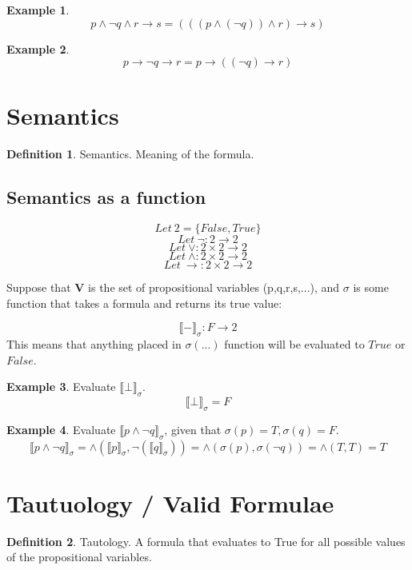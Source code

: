 \documentclass{article}
\theoremstyle{definition}
\newtheorem{df}{Definition}[section]
\newtheorem{ex}{Example}[section]
\begin{document}
  \begin{ex}
    \[p \wedge \neg q \wedge r \rightarrow s = (((p\wedge (\neg q)) \wedge r) \rightarrow s) \]
  \end{ex}
  \begin{ex}
    \[p \rightarrow \neg q \rightarrow r = p \rightarrow ((\neg q) \rightarrow r) \]
  \end{ex}

  \section{Semantics}
  \begin{df}{Semantics.}
    Meaning of the formula.
  \end{df}
  
  \subsection{Semantics as a function}
  \[Let\ 2 = \{False, True\}\]
  \[Let\ \neg: 2 \rightarrow 2\]
  \[Let\ \lor: 2 \times 2 \rightarrow 2 \]
  \[Let\ \wedge: 2 \times 2 \rightarrow 2 \]
  \[Let\ \rightarrow: 2 \times 2 \rightarrow 2 \]
  
  Suppose that \textbf{V} is the set of propositional variables (p,q,r,s,...), and $\sigma$ is some function that takes a formula and returns its true value:

  \[\llbracket - \rrbracket_{\sigma} : F \rightarrow 2 \]
  This means that anything placed in $\sigma(...)$ function will be evaluated to $True$ or $False$.\\
  
  \begin{ex}
    Evaluate $\llbracket \bot \rrbracket_{\sigma}$.
    \[\llbracket \bot \rrbracket_{\sigma} = F\]
  \end{ex}

  \begin{ex}
    Evaluate $\llbracket p \wedge \neg q \rrbracket_{\sigma}$, given that $\sigma(p)=T, \sigma(q)=F$.
    \[\llbracket p \wedge \neg q \rrbracket_{\sigma} = \wedge(\llbracket p \rrbracket_{\sigma}, \neg(\llbracket q \rrbracket_{\sigma})) = \wedge(\sigma(p), \sigma(\neg q)) = \wedge(T, T) = T \]
  \end{ex}

  \section{Tautuology / Valid Formulae}
  \begin{df}{Tautology.}
    A formula that evaluates to True for all possible values of the propositional variables.
  \end{df}
  
\end{document}
